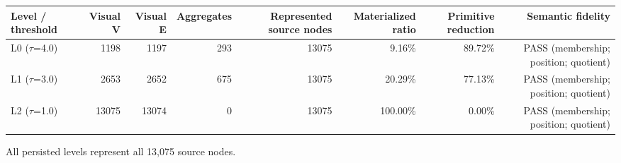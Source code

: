 \begin{tabular}{lrrrrrrr}
\hline
Level / threshold & Visual V & Visual E & Aggregates & Represented source nodes & Materialized ratio & Primitive reduction & Semantic fidelity \\
\hline
L0 (\ensuremath{\tau}=4.0) & 1198 & 1197 & 293 & 13075 & 9.16\% & 89.72\% & PASS (membership; position; quotient) \\
L1 (\ensuremath{\tau}=3.0) & 2653 & 2652 & 675 & 13075 & 20.29\% & 77.13\% & PASS (membership; position; quotient) \\
L2 (\ensuremath{\tau}=1.0) & 13075 & 13074 & 0 & 13075 & 100.00\% & 0.00\% & PASS (membership; position; quotient) \\
\hline
\end{tabular}

\par\smallskip
\footnotesize All persisted levels represent all 13,075 source nodes.
